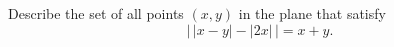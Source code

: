 Describe the set of all points $(x,y)$ in the plane that satisfy
\[\bigl|\,|x-y|-|2x|\,\bigr|=x+y.\]
